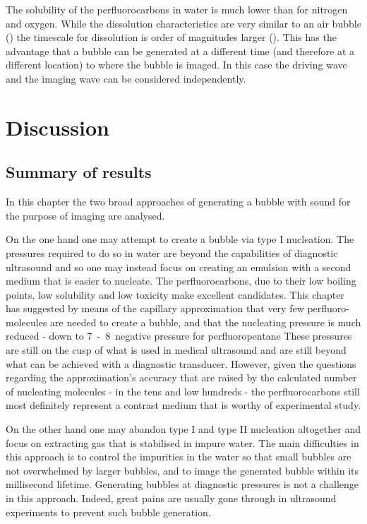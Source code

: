 The solubility of the perfluorocarbons in water is much lower than for nitrogen and oxygen.
While the dissolution characteristics are very similar to an air bubble ()
the timescale for dissolution is order of magnitudes larger ().
This has the advantage that a bubble can be generated at a different time (and therefore at a different location)
to where the bubble is imaged.
In this case  the driving wave and the imaging wave can be considered independently.

\section{Discussion}\label{sec:nuc:discussion}

\subsection{Summary of results}

In this chapter the two broad approaches of generating a bubble with sound for the purpose of imaging are analysed.

On the one hand one may attempt to create a bubble via type I nucleation.
The pressures required to do so in water are beyond the capabilities of diagnostic ultrasound
and so one may instead focus on creating an emulsion with a second medium that is easier to nucleate.
The perfluorocarbons, due to their low boiling points, low solubility and low toxicity make excellent 
candidates.
This chapter has suggested by means of the capillary approximation that very few perfluoro-molecules are 
needed to create a bubble, and that the nucleating pressure is much reduced - down to \unit{7-8}\mega\pascal\ negative pressure for
perfluoropentane
These pressures are still on the cusp of what is used in medical ultrasound
and are still beyond what can be achieved with a diagnostic transducer.
However, given the questions regarding the approximation's accuracy that are raised by the calculated number of nucleating molecules 
- in the tens and low hundreds - 
the perfluorocarbons still most definitely represent a contrast medium that is worthy of experimental study.

On the other hand one may abandon type I and type II nucleation altogether and focus on extracting gas that is stabilised in impure water.
The main difficulties in this approach is to control the impurities in the water so that small bubbles are not overwhelmed by larger bubbles,
and to image the generated bubble within its millisecond lifetime.
Generating bubbles at diagnostic pressures is not a challenge in this approach.
Indeed, great pains are usually gone through in ultrasound experiments to prevent such bubble generation.

